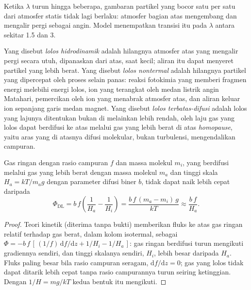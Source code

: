 
Ketika $\lambda$ turun hingga beberapa, gambaran partikel yang bocor satu per satu
dari atmosfer statis tidak lagi berlaku: atmosfer bagian atas mengembang dan mengalir
pergi sebagai angin. Model menempatkan transisi itu pada $\lambda$ antara sekitar 1.5
dan 3.

\begin{definition}\label{def:b3:planetary-atmospheres:hydrodynamic}
Yang disebut \emph{lolos hidrodinamik} adalah hilangnya
atmosfer atas yang mengalir pergi secara utuh, dipanaskan dari atas, saat
 kecil; aliran itu dapat menyeret partikel yang lebih berat.
Yang disebut \emph{lolos nontermal} adalah hilangnya
partikel yang dipercepat oleh proses selain panas: reaksi fotokimia yang
memberi fragmen energi melebihi energi lolos, ion yang terangkat
oleh medan listrik angin Matahari, pemercikan oleh ion yang menabrak
atmosfer atas, dan aliran keluar ion sepanjang garis medan magnet.
Yang disebut \emph{lolos terbatas-difusi} adalah lolos
yang lajunya ditentukan bukan di  melainkan lebih rendah, oleh laju
gas yang lolos dapat berdifusi ke atas melalui gas yang lebih berat di atas
\emph{homopause}, yaitu aras yang di atasnya difusi molekular,
bukan turbulensi, mengendalikan campuran.
\end{definition}

\begin{proposition}\label{prop:b3:planetary-atmospheres:diffusion}
Gas ringan dengan rasio campuran $f$ dan massa molekul $m_i$, yang berdifusi
melalui gas yang lebih berat dengan massa molekul $m_a$ dan tinggi skala $H_a =
kT/m_a g$ dengan parameter difusi biner $b$, tidak dapat naik lebih cepat
daripada
\[
\Phi_\mathrm{DL} = b\,f\left(\frac1{H_a} - \frac1{H_i}\right)
= \frac{b\,f\,(m_a - m_i)\,g}{kT} \approx \frac{b\,f}{H_a}.
\]
\end{proposition}

\begin{proof}
Teori kinetik (diterima tanpa bukti) memberikan fluks ke atas gas ringan
relatif terhadap gas berat, dalam kolom isotermal, sebagai $\Phi = -b\,f\,
[\,(1/f)\,\mathrm df/\mathrm dz + 1/H_i - 1/H_a\,]$: gas ringan
berdifusi turun mengikuti gradiennya sendiri, dan tinggi skalanya sendiri, $H_i$, lebih besar
daripada $H_a$. Fluks paling besar bila rasio campuran seragam, $\mathrm
df/\mathrm dz = 0$; gas yang lolos tidak dapat ditarik lebih cepat tanpa
rasio campurannya turun seiring ketinggian. Dengan $1/H = mg/kT$ kedua bentuk
itu mengikuti.
\end{proof}

